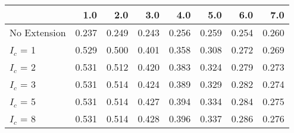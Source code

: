 \begin{tabular}{lrrrrrrr}
\toprule
{} &   1.0 &   2.0 &   3.0 &   4.0 &   5.0 &   6.0 &   7.0 \\
\midrule
No Extension & 0.237 & 0.249 & 0.243 & 0.256 & 0.259 & 0.254 & 0.260 \\
$I_c$ = 1    & 0.529 & 0.500 & 0.401 & 0.358 & 0.308 & 0.272 & 0.269 \\
$I_c$ = 2    & 0.531 & 0.512 & 0.420 & 0.383 & 0.324 & 0.279 & 0.273 \\
$I_c$ = 3    & 0.531 & 0.514 & 0.424 & 0.389 & 0.329 & 0.282 & 0.274 \\
$I_c$ = 5    & 0.531 & 0.514 & 0.427 & 0.394 & 0.334 & 0.284 & 0.275 \\
$I_c$ = 8    & 0.531 & 0.514 & 0.428 & 0.396 & 0.337 & 0.286 & 0.276 \\
\bottomrule
\end{tabular}

